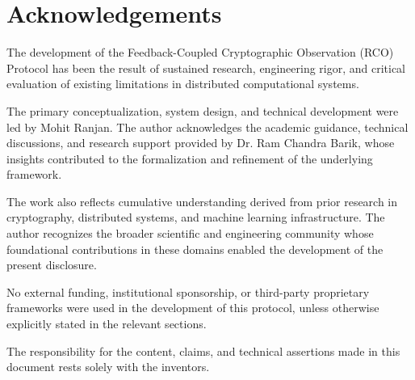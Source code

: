 \chapter*{Acknowledgements}

The development of the Feedback-Coupled Cryptographic Observation (RCO) Protocol has been the result of sustained research, engineering rigor, and critical evaluation of existing limitations in distributed computational systems.

The primary conceptualization, system design, and technical development were led by Mohit Ranjan. The author acknowledges the academic guidance, technical discussions, and research support provided by Dr. Ram Chandra Barik, whose insights contributed to the formalization and refinement of the underlying framework.

The work also reflects cumulative understanding derived from prior research in cryptography, distributed systems, and machine learning infrastructure. The author recognizes the broader scientific and engineering community whose foundational contributions in these domains enabled the development of the present disclosure.

No external funding, institutional sponsorship, or third-party proprietary frameworks were used in the development of this protocol, unless otherwise explicitly stated in the relevant sections.

The responsibility for the content, claims, and technical assertions made in this document rests solely with the inventors.